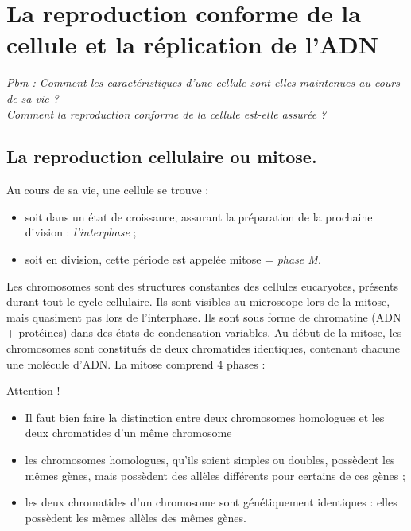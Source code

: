 %
\chapter{La reproduction conforme de la cellule et la réplication de l’ADN}
\label{sec:reproduction_conforme}


\emph{
Pbm : 	Comment les caractéristiques d’une cellule sont-elles maintenues au cours de sa vie ? \\
Comment la reproduction conforme de la cellule est-elle assurée ?
}

\section{La reproduction cellulaire ou mitose.}
\label{sec:mitose}

Au cours de sa vie, une cellule se trouve : 
\begin{itemize}
\item soit dans un état de croissance, assurant la préparation de la prochaine division : \emph{l’interphase} ;
\item soit en division, cette période est appelée mitose = \emph{phase M}. 
\end{itemize}
Les chromosomes sont des structures constantes des cellules eucaryotes, présents durant tout le cycle cellulaire. Ils sont visibles au microscope lors de la mitose, mais quasiment pas lors de l’interphase. Ils sont sous forme de chromatine (ADN + protéines) dans des états de condensation variables.
Au début de la mitose, les chromosomes sont constitués de deux chromatides identiques, contenant chacune une molécule d’ADN.
La mitose comprend 4 phases :

Attention !\begin{itemize}
\item	Il faut bien faire la distinction entre deux chromosomes homologues et les deux chromatides d'un même chromosome 
\item	les chromosomes homologues, qu'ils soient simples ou doubles, possèdent les mêmes gènes, mais possèdent des allèles différents pour certains de ces gènes ;
\item	les deux chromatides d'un chromosome sont génétiquement identiques : elles possèdent les mêmes allèles des mêmes gènes.\end{itemize}
